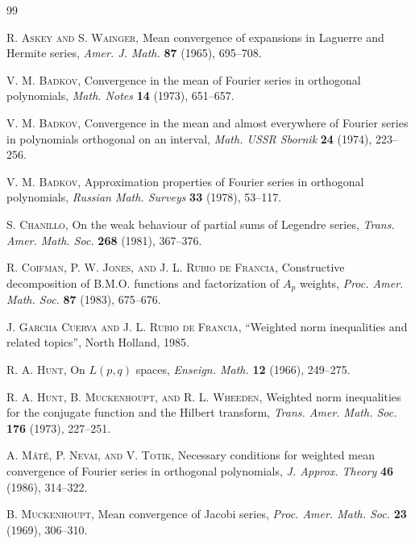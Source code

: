 \documentclass[10pt,a4paper]{article}
\theoremstyle{plain}
\theoremstyle{remark}
\begin{document}
\begin{thebibliography}{99}

\frenchspacing

\textsc{R. Askey and S. Wainger}, Mean convergence of expansions
in Laguerre and Hermite series, \textit{Amer. J. Math.} \textbf{87} (1965),
695--708.

\textsc{V. M. Badkov}, Convergence in the mean of Fourier series
in orthogonal polynomials, \textit{Math. Notes} \textbf{14} (1973), 651--657.

\textsc{V. M. Badkov}, Convergence in the mean and almost everywhere
of Fourier series in polynomials orthogonal on an interval,
\textit{Math. USSR Sbornik} \textbf{24} (1974), 223--256.

\textsc{V. M. Badkov}, Approximation properties of Fourier series
in orthogonal polynomials, \textit{Russian Math. Surveys} \textbf{33} (1978),
53--117.

\textsc{S. Chanillo}, On the weak behaviour of partial
sums of Legendre series, \textit{Trans. Amer. Math. Soc.} \textbf{268}
(1981), 367--376.

\textsc{R. Coifman, P. W. Jones, and J. L. Rubio de Francia},
Constructive decomposition of B.M.O. functions and
factorization of $A_p$ weights, \textit{Proc. Amer. Math. Soc.} \textbf{87}
(1983), 675--676.

\textsc{J. Garc\i{\i}a Cuerva and J. L. Rubio de Francia}, ``Weighted
norm inequalities and related topics'', North Holland,
1985.

\textsc{R. A. Hunt}, On $L(p,q)$ spaces, \textit{Enseign. Math.}
\textbf{12} (1966), 249--275.

\textsc{R. A. Hunt, B. Muckenhoupt, and R. L. Wheeden}, Weighted
norm inequalities for the conjugate function and the Hilbert
transform, \textit{Trans. Amer. Math. Soc.} \textbf{176} (1973), 227--251.

\textsc{A. M\'at\'e, P. Nevai, and V. Totik}, Necessary conditions
for weighted mean convergence of Fourier series in orthogonal
polynomials, \textit{J. Approx. Theory} \textbf{46} (1986), 314--322.

\textsc{B. Muckenhoupt}, Mean convergence of Jacobi series,
\textit{Proc. Amer. Math. Soc.} \textbf{23} (1969), 306--310.


\end{thebibliography}
\end{document}
